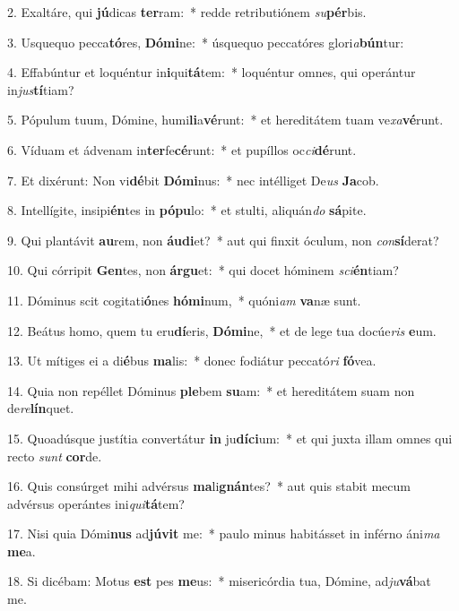 2. Exaltáre, qui \textbf{jú}dicas \textbf{ter}ram:~*  redde retributiónem \textit{su}\textbf{pér}bis.\

3. Usquequo pecca\textbf{tó}res, \textbf{Dó}\textbf{mi}ne:~*  úsquequo peccatóres glori\textit{a}\textbf{bún}tur:\

4. Effabúntur et loquéntur in\textbf{i}qui\textbf{tá}tem:~*  loquéntur omnes, qui operántur in\textit{jus}\textbf{tí}tiam?\

5. Pópulum tuum, Dómine, humi\textbf{li}a\textbf{vé}runt:~*  et hereditátem tuam ve\textit{xa}\textbf{vé}runt.\

6. Víduam et ádvenam in\textbf{ter}fe\textbf{cé}runt:~*  et pupíllos oc\textit{ci}\textbf{dé}runt.\

7. Et dixérunt: Non vi\textbf{dé}bit \textbf{Dó}\textbf{mi}nus:~*  nec intélliget De\textit{us} \textbf{Ja}cob.\

8. Intellígite, insipi\textbf{én}tes in \textbf{pó}\textbf{pu}lo:~*  et stulti, aliquán\textit{do} \textbf{sá}pite.\

9. Qui plantávit \textbf{au}rem, non \textbf{áu}\textbf{di}et?~*  aut qui finxit óculum, non \textit{con}\textbf{sí}derat?\

10. Qui córripit \textbf{Gen}tes, non \textbf{ár}\textbf{gu}et:~*  qui docet hóminem \textit{sci}\textbf{én}tiam?\

11. Dóminus scit cogitati\textbf{ó}nes \textbf{hó}\textbf{mi}num,~*  quóni\textit{am} \textbf{va}næ sunt.\

12. Beátus homo, quem tu eru\textbf{dí}eris, \textbf{Dó}\textbf{mi}ne,~*  et de lege tua docúe\textit{ris} \textbf{e}um.\

13. Ut mítiges ei a di\textbf{é}bus \textbf{ma}lis:~*  donec fodiátur peccató\textit{ri} \textbf{fó}vea.\

14. Quia non repéllet Dóminus \textbf{ple}bem \textbf{su}am:~*  et hereditátem suam non de\textit{re}\textbf{lín}quet.\

15. Quoadúsque justítia convertátur \textbf{in} ju\textbf{dí}\textbf{ci}um:~*  et qui juxta illam omnes qui recto \textit{sunt} \textbf{cor}de.\

16. Quis consúrget mihi advérsus \textbf{ma}li\textbf{gnán}tes?~*  aut quis stabit mecum advérsus operántes ini\textit{qui}\textbf{tá}tem?\

17. Nisi quia Dómi\textbf{nus} ad\textbf{jú}\textbf{vit} me:~*  paulo minus habitásset in inférno áni\textit{ma} \textbf{me}a.\

18. Si dicébam: Motus \textbf{est} pes \textbf{me}us:~*  misericórdia tua, Dómine, ad\textit{ju}\textbf{vá}bat me.\

